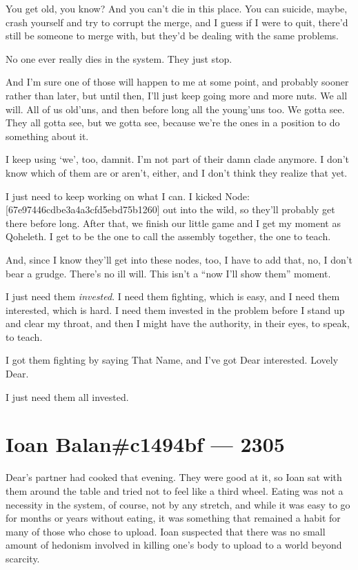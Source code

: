 You get old, you know? And you can't die in this place. You can suicide, maybe, crash yourself and try to corrupt the merge, and I guess if I were to quit, there'd still be someone to merge with, but they'd be dealing with the same problems.

No one ever really dies in the system. They just stop.

And I'm sure one of those will happen to me at some point, and probably sooner rather than later, but until then, I'll just keep going more and more nuts. We all will. All of us old'uns, and then before long all the young'uns too. We gotta see. They all gotta see, but we gotta see, because we're the ones in a position to do something about it.

I keep using `we', too, damnit. I'm not part of their damn clade anymore. I don't know which of them are or aren't, either, and I don't think they realize that yet.

I just need to keep working on what I can. I kicked Node: {[}67e97446cdbe3a4a3cfd5ebd75b1260{]} out into the wild, so they'll probably get there before long. After that, we finish our little game and I get my moment as Qoheleth. I get to be the one to call the assembly together, the one to teach.

And, since I know they'll get into these nodes, too, I have to add that, no, I don't bear a grudge. There's no ill will. This isn't a ``now I'll show them'' moment.

I just need them \emph{invested}. I need them fighting, which is easy, and I need them interested, which is hard. I need them invested in the problem before I stand up and clear my throat, and then I might have the authority, in their eyes, to speak, to teach.

I got them fighting by saying That Name, and I've got Dear interested. Lovely Dear.

I just need them all invested.

\chapter*{Ioan Balan\#c1494bf — 2305}

Dear's partner had cooked that evening. They were good at it, so Ioan sat with them around the table and tried not to feel like a third wheel. Eating was not a necessity in the system, of course, not by any stretch, and while it was easy to go for months or years without eating, it was something that remained a habit for many of those who chose to upload. Ioan suspected that there was no small amount of hedonism involved in killing one's body to upload to a world beyond scarcity.

